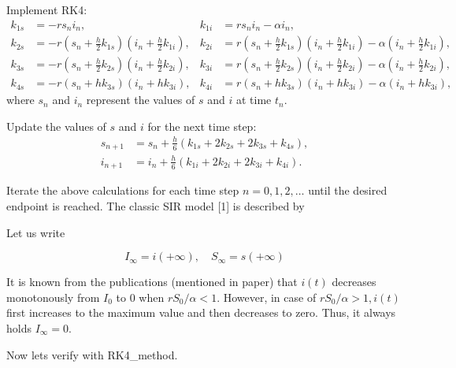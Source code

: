 \documentclass[10pt]{article}
\begin{document}
Implement RK4:
\begin{align*}
k_{1s} &= -r s_n i_n, & k_{1i} &= r s_n i_n - \alpha i_n, \\
k_{2s} &= -r \left(s_n + \frac{h}{2} k_{1s}\right) \left(i_n + \frac{h}{2} k_{1i}\right), & k_{2i} &= r \left(s_n + \frac{h}{2} k_{1s}\right) \left(i_n + \frac{h}{2} k_{1i}\right) - \alpha \left(i_n + \frac{h}{2} k_{1i}\right), \\
k_{3s} &= -r \left(s_n + \frac{h}{2} k_{2s}\right) \left(i_n + \frac{h}{2} k_{2i}\right), & k_{3i} &= r \left(s_n + \frac{h}{2} k_{2s}\right) \left(i_n + \frac{h}{2} k_{2i}\right) - \alpha \left(i_n + \frac{h}{2} k_{2i}\right), \\
k_{4s} &= -r \left(s_n + h k_{3s}\right) \left(i_n + h k_{3i}\right), & k_{4i} &= r \left(s_n + h k_{3s}\right) \left(i_n + h k_{3i}\right) - \alpha \left(i_n + h k_{3i}\right),
\end{align*}
where \(s_n\) and \(i_n\) represent the values of \(s\) and \(i\) at time \(t_n\).

Update the values of \(s\) and \(i\) for the next time step:
\begin{align*}
s_{n+1} &= s_n + \frac{h}{6} (k_{1s} + 2k_{2s} + 2k_{3s} + k_{4s}), \\
i_{n+1} &= i_n + \frac{h}{6} (k_{1i} + 2k_{2i} + 2k_{3i} + k_{4i}).
\end{align*}

Iterate the above calculations for each time step \(n = 0, 1, 2, \dots\) until the desired endpoint is reached.
  The classic SIR model [1] is described by




Let us write

$$
I_{\infty}=i(+\infty), \quad S_{\infty}=s(+\infty)
$$

It is known from the  publications (mentioned in paper)  that $i(t)$ decreases monotonously from $I_{0}$ to 0 when $r S_{0} / \alpha<1$. However, in case of $r S_{0} / \alpha>1, i(t)$ first increases to the maximum value and then decreases to zero. Thus, it always holds $I_{\infty}=0$.
\newline

Now lets verify with RK4\_method.
\end{document}
